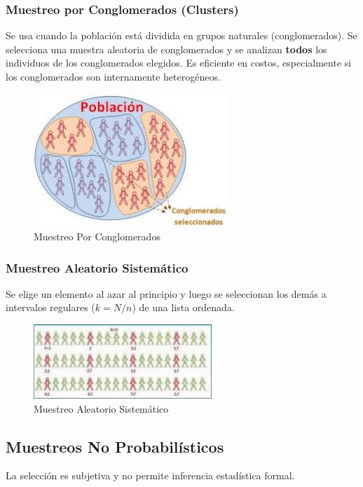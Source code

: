 \documentclass[12pt, letterpaper]{article}
\begin{document}
\subsubsection{Muestreo por Conglomerados (Clusters)}
Se usa cuando la población está dividida en grupos naturales (conglomerados). Se selecciona una muestra aleatoria de conglomerados y se analizan \textbf{todos} los individuos de los conglomerados elegidos. Es eficiente en costos, especialmente si los conglomerados son internamente heterogéneos.

\begin{figure}[htbp]
    \centering
    \includegraphics[width=0.65\textwidth]{MPC}
    \caption{Muestreo Por Conglomerados}
    \label{fig:MPC}
\end{figure}


\subsubsection{Muestreo Aleatorio Sistemático}
Se elige un elemento al azar al principio y luego se seleccionan los demás a intervalos regulares ($k=N/n$) de una lista ordenada.

\begin{figure}[htbp]
    \centering
    \includegraphics[width=0.6\textwidth]{MASIS}
    \caption{Muestreo Aleatorio Sistemático}
    \label{fig:MASIS}
\end{figure}
\newpage

\subsection{Muestreos No Probabilísticos}
La selección es subjetiva y no permite inferencia estadística formal.
\end{document}
